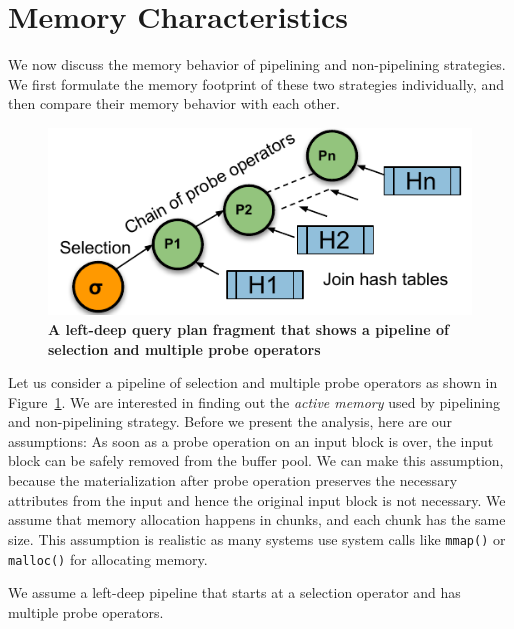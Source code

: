\section{Memory Characteristics}
We now discuss the memory behavior of pipelining and non-pipelining strategies.
We first formulate the memory footprint of these two strategies individually, and then compare their memory behavior with each other. 

\begin{figure}[t]
	\centering 
	\includegraphics{figures/Left-deep-pipeline}
	\caption{\textbf{A left-deep query plan fragment that shows a pipeline of selection and multiple probe operators}}
	\label{fig:left-deep-plan}
\end{figure}

Let us consider a pipeline of selection and multiple probe operators as shown in Figure~\ref{fig:left-deep-plan}.
We are interested in finding out the \textit{active memory} used by pipelining and non-pipelining strategy.
Before we present the analysis, here are our assumptions:
As soon as a probe operation on an input block is over, the input block can be safely removed from the buffer pool.
We can make this assumption, because the materialization after probe operation preserves the necessary attributes from the input and hence the original input block is not necessary.
We assume that memory allocation happens in chunks, and each chunk has the same size. 
This assumption is realistic as many systems use system calls like \texttt{mmap()} or \texttt{malloc()} for allocating memory.

We assume a left-deep pipeline that starts at a selection operator and has multiple probe operators.
